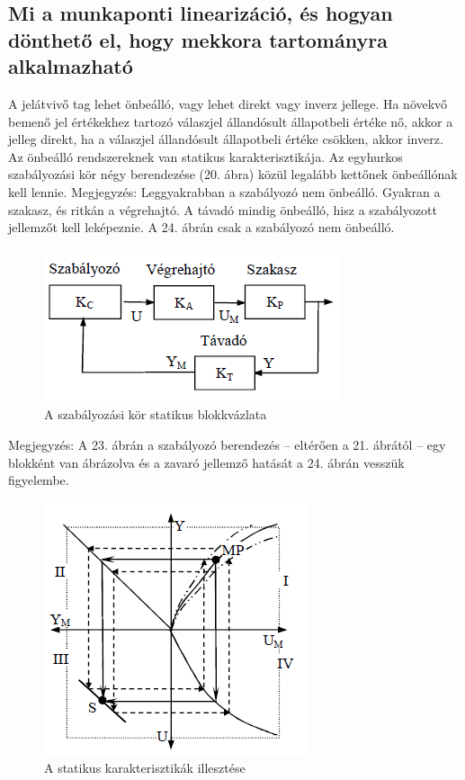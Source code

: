 \documentclass[11pt,a4paper]{article}
\begin{document}
\subsection{Mi a munkaponti linearizáció, és hogyan dönthető el, hogy mekkora tartományra alkalmazható}
A jelátvivő tag lehet önbeálló, vagy lehet direkt vagy inverz jellege. Ha növekvő
bemenő jel értékekhez tartozó válaszjel állandósult állapotbeli értéke nő, akkor
a jelleg direkt, ha a válaszjel állandósult állapotbeli értéke csökken, akkor inverz. Az
önbeálló rendszereknek van statikus karakterisztikája. Az egyhurkos szabályozási kör
négy berendezése (20. ábra) közül legalább kettőnek önbeállónak kell lennie.
Megjegyzés: Leggyakrabban a szabályozó nem önbeálló. Gyakran a szakasz, és
ritkán a végrehajtó. A távadó mindig önbeálló, hisz a szabályozott jellemzőt kell leképeznie.
A 24. ábrán csak a szabályozó nem önbeálló.
\begin{figure}[hbtp]
    	 \centering
		\includegraphics[scale=1.0]{23_szabalyozas_stat.png}
		\caption{A szabályozási kör statikus blokkvázlata}
\end{figure}
Megjegyzés: A 23. ábrán a szabályozó
berendezés – eltérően a 21. ábrától – egy blokként
van ábrázolva és a zavaró jellemző hatását
a 24. ábrán vesszük figyelembe.
\begin{figure}[hbtp]
    	 \centering
		\includegraphics[scale=1.0]{24_szabalyozas_karak.png}
		\caption{A statikus karakterisztikák illesztése}
\end{figure}
\end{document}
